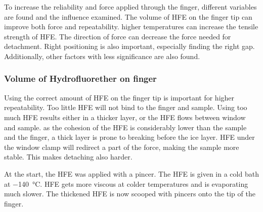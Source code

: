 To increase the reliability and force applied through the finger, different variables are found and the influence examined. The volume of HFE on the finger tip can improve both force and repeatability. higher temperatures can increase the tensile strength of HFE. The direction of force can decrease the force needed for detachment. Right positioning is also important, especially finding the right gap. Additionally, other factors with less significance are also found.



\subsubsection{Volume of Hydrofluorether on finger}


Using the correct amount of HFE on the finger tip is important for higher repeatability. Too little HFE will not bind to the finger and sample. Using too much HFE results either in a thicker layer, or the HFE flows between window and sample. as the cohesion of the HFE is considerably lower than the sample and the finger, a thick layer is prone to breaking before the ice layer. HFE under the window clamp will redirect a part of the force, making the sample more stable. This makes detaching also harder.

At the start, the HFE was applied with a pincer. The HFE is given in a cold bath at \SI{-140}{\degreeCelsius}. HFE gets more viscous at colder temperatures and is evaporating much slower. The thickened HFE is now scooped with pincers onto the tip of the finger.

